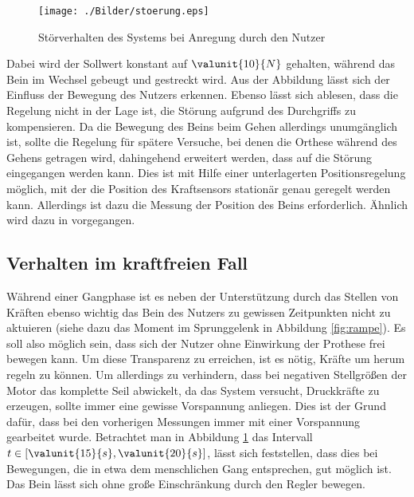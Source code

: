 \begin{figure}[H]
	\centering
	\texttt{[image: ./Bilder/stoerung.eps]}
	\caption[störung]{Störverhalten des Systems bei Anregung durch den Nutzer}
	\label{fig:störung}
\end{figure}
Dabei wird der Sollwert konstant auf $\valunit{10}{N}$ gehalten, während das Bein im Wechsel gebeugt und gestreckt wird. Aus der Abbildung lässt sich der Einfluss der Bewegung des Nutzers erkennen. Ebenso lässt sich ablesen, dass die Regelung nicht in der Lage ist, die Störung aufgrund des Durchgriffs zu kompensieren. Da die Bewegung des Beins beim Gehen allerdings unumgänglich ist, sollte die Regelung für spätere Versuche, bei denen die Orthese während des Gehens getragen wird, dahingehend erweitert werden, dass auf die Störung eingegangen werden kann. Dies ist mit Hilfe einer unterlagerten Positionsregelung möglich, mit der die Position des Kraftsensors stationär genau geregelt werden kann. Allerdings ist dazu die Messung der Position des Beins erforderlich. Ähnlich wird dazu in \cite{Ding.31.05.201407.06.2014} vorgegangen. 

\subsection{Verhalten im kraftfreien Fall}
Während einer Gangphase ist es neben der Unterstützung durch das Stellen von Kräften ebenso wichtig das Bein des Nutzers zu gewissen Zeitpunkten nicht zu aktuieren (siehe dazu das Moment im Sprunggelenk in Abbildung \ref{fig:rampe}). Es soll also möglich sein, dass sich der Nutzer ohne Einwirkung der Prothese frei bewegen kann. Um diese Transparenz zu erreichen, ist es nötig, Kräfte um  herum regeln zu können. Um allerdings zu verhindern, dass bei negativen Stellgrößen der Motor das komplette Seil abwickelt, da das System versucht, Druckkräfte zu erzeugen, sollte immer eine gewisse Vorspannung anliegen. Dies ist der Grund dafür, dass bei den vorherigen Messungen immer mit einer Vorspannung gearbeitet wurde. Betrachtet man in Abbildung \ref{fig:störung} das Intervall $t \in [\valunit{15}{s}, \valunit{20}{s}]$, lässt sich feststellen, dass dies bei Bewegungen, die in etwa dem menschlichen Gang entsprechen, gut möglich ist. Das Bein lässt sich ohne große Einschränkung durch den Regler bewegen.

